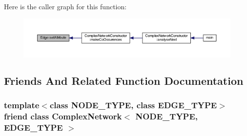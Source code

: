Here is the caller graph for this function\+:\nopagebreak
\begin{figure}[H]
\begin{center}
\leavevmode
\includegraphics[width=350pt]{class_edge_aa63f7fac23602924d2e19f1389a93620_icgraph}
\end{center}
\end{figure}




\subsection{Friends And Related Function Documentation}
\hypertarget{class_edge_ad8438fc5199b628ea294f77319026b6a}{
\subsubsection[{Complex\+Network$<$ N\+O\+D\+E\+\_\+\+T\+Y\+P\+E, E\+D\+G\+E\+\_\+\+T\+Y\+P\+E $>$}]{\setlength{\rightskip}{0pt plus 5cm}template$<$class N\+O\+D\+E\+\_\+\+T\+Y\+P\+E, class E\+D\+G\+E\+\_\+\+T\+Y\+P\+E$>$ friend class {\bf Complex\+Network}$<$ N\+O\+D\+E\+\_\+\+T\+Y\+P\+E, E\+D\+G\+E\+\_\+\+T\+Y\+P\+E $>$\hspace{0.3cm}{\ttfamily [friend]}}}\label{class_edge_ad8438fc5199b628ea294f77319026b6a}


